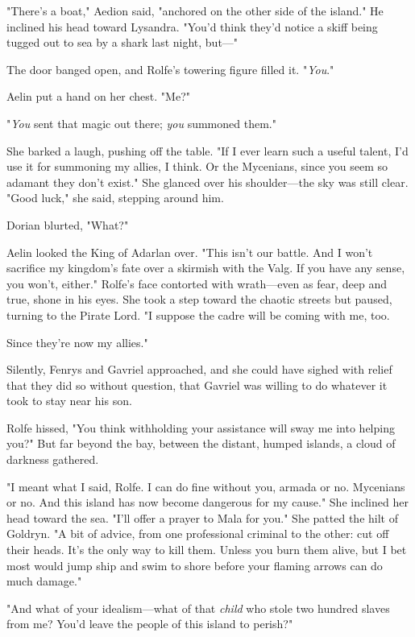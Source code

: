 "There's a boat," Aedion said, "anchored on the other side of the island." He inclined his head toward Lysandra. "You'd think they'd notice a skiff being tugged out to sea by a shark last night, but---"

The door banged open, and Rolfe's towering figure filled it. "\emph{You}."

Aelin put a hand on her chest. "Me?"

"\emph{You} sent that magic out there; \emph{you} summoned them."

She barked a laugh, pushing off the table. "If I ever learn such a useful talent, I'd use it for summoning my allies, I think. Or the Mycenians, since you seem so adamant they don't exist." She glanced over his shoulder---the sky was still clear. "Good luck," she said, stepping around him.

Dorian blurted, "What?"

Aelin looked the King of Adarlan over. "This isn't our battle. And I won't sacrifice my kingdom's fate over a skirmish with the Valg. If you have any sense, you won't, either." Rolfe's face contorted with wrath---even as fear, deep and true, shone in his eyes. She took a step toward the chaotic streets but paused, turning to the Pirate Lord. "I suppose the cadre will be coming with me, too.

Since they're now my allies."

Silently, Fenrys and Gavriel approached, and she could have sighed with relief that they did so without question, that Gavriel was willing to do whatever it took to stay near his son.

Rolfe hissed, "You think withholding your assistance will sway me into helping you?" But far beyond the bay, between the distant, humped islands, a cloud of darkness gathered.

"I meant what I said, Rolfe. I can do fine without you, armada or no. Mycenians or no. And this island has now become dangerous for my cause." She inclined her head toward the sea. "I'll offer a prayer to Mala for you." She patted the hilt of Goldryn. "A bit of advice, from one professional criminal to the other: cut off their heads. It's the only way to kill them. Unless you burn them alive, but I bet most would jump ship and swim to shore before your flaming arrows can do much damage."

"And what of your idealism---what of that \emph{child} who stole two hundred slaves from me? You'd leave the people of this island to perish?"

